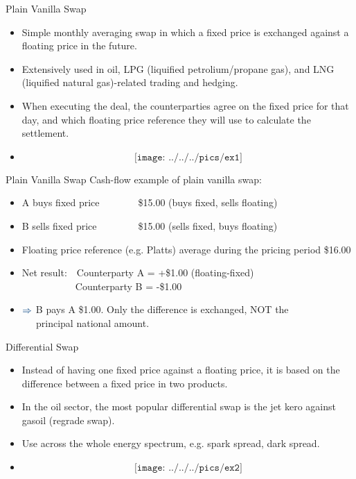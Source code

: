 

{Plain Vanilla Swap}
\begin{itemize}
  \item<1-> Simple monthly averaging swap in which a fixed price is exchanged against a floating price in the future.
  \item<2-> Extensively used in oil, LPG (liquified petrolium/propane gas), and LNG (liquified natural gas)-related trading and hedging.
  \item<3-> When executing the deal, the counterparties agree on the fixed price for that day, and which floating price reference they will use to calculate the settlement.
      \item<4->
$$\texttt{[image: ../../../pics/ex1]}$$
\end{itemize}



{Plain Vanilla Swap}
\textcolor[rgb]{0.00,0.25,0.50}{Cash-flow example of plain vanilla swap:}\\
\begin{itemize}
\item<1->
A buys fixed price$\qquad\qquad$\$15.00 (buys fixed, sells floating)
\item<2-> B sells fixed price$\qquad\qquad\;$\$15.00 (sells fixed, buys floating)
\item<3->
Floating price reference (e.g. Platts) average during the pricing period \$16.00
\item<4->
\vspace{0.3cm}
\textcolor[rgb]{0.00,0.25,0.50}{Net result:}$\quad$Counterparty A = +\$1.00 (floating-fixed)\\
$\qquad\qquad\quad\,$  Counterparty B = -\$1.00
\item<5->
$\textcolor[rgb]{0.00,0.25,0.50}{\Rightarrow}$ B pays A \$1.00. Only the difference is exchanged, NOT the \\
$\quad\;\,$principal national amount.
\end{itemize}




{Differential Swap}
\begin{itemize}
  \item<1-> Instead of having one fixed price against a floating price, it is based on the difference between a fixed price in two products.
  \item<2-> In the oil sector, the most popular differential swap is the jet kero against gasoil (regrade swap).
  \item<3-> Use across the whole energy spectrum, e.g. spark spread, dark spread.
\item<4->
$$\texttt{[image: ../../../pics/ex2]}$$
\end{itemize}




